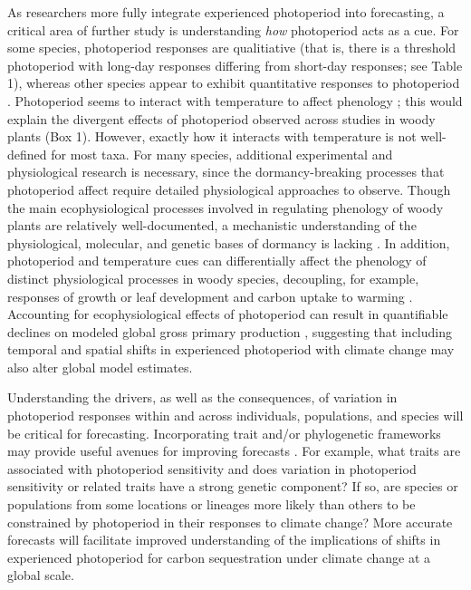 \documentclass{article}
\begin{document}
\par As researchers more fully integrate experienced photoperiod into forecasting, a critical area of further study is understanding \emph{how} photoperiod acts as a cue. For some species, photoperiod responses are qualitiative (that is, there is a threshold photoperiod with long-day responses differing from short-day responses; see Table 1), whereas other species appear to exhibit quantitative responses to photoperiod \citep{wareing1956}. Photoperiod seems to interact with temperature to affect phenology \citep[e.g.,][]{zydlewski2014}; this would explain the divergent effects of photoperiod observed across studies in woody plants (Box 1). However, exactly how it interacts with temperature is not well-defined for most taxa. For many species, additional experimental and physiological research is necessary, since the dormancy-breaking processes that photoperiod affect require detailed physiological approaches to observe. Though the main ecophysiological processes involved in regulating phenology of woody plants are relatively well-documented, a  mechanistic understanding of the physiological, molecular, and genetic bases of dormancy is lacking \citep[Box 2,][]{hanninen2019, chuine2016}. In addition, photoperiod and temperature cues can differentially affect the phenology of distinct physiological processes in woody species, decoupling, for example, responses of growth or leaf development and carbon uptake to warming \citep{stinziano2017,bauerle2012}. Accounting for ecophysiological effects of photoperiod can result in quantifiable declines on modeled global gross primary production \citep{bauerle2012}, suggesting that including temporal and spatial shifts in experienced photoperiod with climate change may also alter global model estimates.
\par Understanding the drivers, as well as the consequences, of variation in photoperiod responses within and across individuals, populations, and species will be critical for forecasting.  Incorporating trait and/or phylogenetic frameworks may provide useful avenues for improving forecasts \citep{buckley2012}. For example, what traits are associated with photoperiod sensitivity and does variation in photoperiod sensitivity or related traits have a strong genetic component? If so, are species or populations from some locations or lineages more likely than others to be constrained by photoperiod in their responses to climate change? More accurate forecasts will facilitate improved understanding of the implications of shifts in experienced photoperiod for carbon sequestration under climate change at a global scale.
\end{document}
